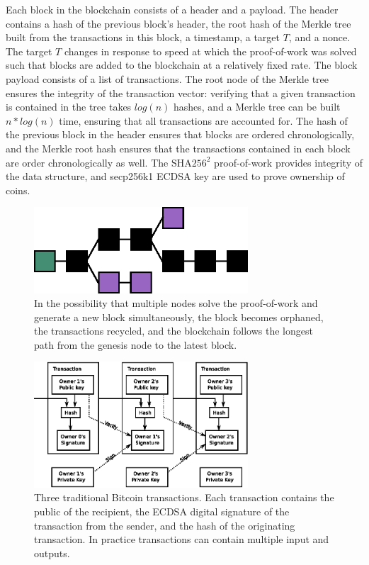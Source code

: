 Each block in the blockchain consists of a header and a payload. The header contains a hash of the previous block's header, the root hash of the Merkle tree built from the transactions in this block, a timestamp, a target $ T $, and a nonce. The target $ T $ changes in response to speed at which the proof-of-work was solved such that blocks are added to the blockchain at a relatively fixed rate. The block payload consists of a list of transactions. The root node of the Merkle tree ensures the integrity of the transaction vector: verifying that a given transaction is contained in the tree takes $ log(n) $ hashes, and a Merkle tree can be built $ n * log(n) $ time, ensuring that all transactions are accounted for. The hash of the previous block in the header ensures that blocks are ordered chronologically, and the Merkle root hash ensures that the transactions contained in each block are order chronologically as well. The $ \textrm{SHA}256^{{2}} $ proof-of-work provides integrity of the data structure, and secp256k1 ECDSA key are used to prove ownership of coins.\cite{Okupski2014}

\begin{figure}[htbp]
\centering
\begin{minipage}{8 cm}
  \includegraphics[width=80mm]{images/Blockchain-2.eps}
  \caption{In the possibility that multiple nodes solve the proof-of-work and generate a new block simultaneously, the block becomes orphaned, the transactions recycled, and the blockchain follows the longest path from the genesis node to the latest block.}
\end{minipage}
\end{figure}

\begin{figure}[htbp]
\centering
\begin{minipage}{8 cm}
  \includegraphics[width=80mm]{images/bitcoin_transaction.eps}
  \caption{Three traditional Bitcoin transactions. Each transaction contains the public  of the recipient, the ECDSA digital signature of the transaction from the sender, and the hash of the originating transaction. In practice transactions can contain multiple input and outputs.}
\end{minipage}
\end{figure}


